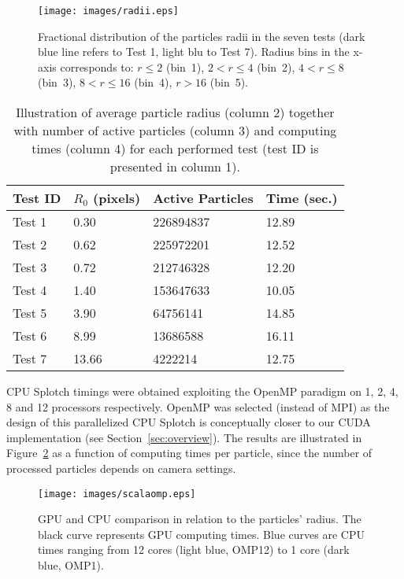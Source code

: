 \documentclass[1p]{elsarticle}
\begin{document}
\begin{figure}
\centering
\texttt{[image: images/radii.eps]}
\caption{Fractional distribution of the particles radii in the seven tests (dark blue line refers to Test 1, light blu to Test 7). Radius bins in the x-axis corresponds to: $r\le 2$ (bin~1), $2<r\le 4$ (bin~2), $4<r\le 8$ (bin~3), $8<r\le 16$ (bin~4), $r>16$ (bin~5). 
}
\label{fig:radii}
\end{figure}

\begin{table}
\begin{center}
\begin{tabular}{|l|l|l|l|}
\hline
Test ID & $R_0$ (pixels) & Active Particles & Time (sec.) \\
\hline
Test 1  & 0.30   & 226894837  & 12.89 \\
\hline
Test 2  & 0.62   & 225972201  & 12.52 \\
\hline
Test 3  & 0.72   & 212746328  & 12.20 \\
\hline
Test 4  & 1.40   & 153647633  & 10.05 \\
\hline
Test 5  & 3.90   & 64756141   & 14.85 \\
\hline
Test 6  & 8.99   & 13686588   & 16.11 \\
\hline
Test 7  & 13.66  & 4222214    & 12.75 \\
\hline
\end{tabular}
\end{center}
\caption{Illustration of average particle radius (column 2) together with number of active particles (column 3)
and computing times (column 4) for each performed test (test ID is presented in column 1).}
\label{tab:radius}
\end{table}

CPU Splotch timings were obtained exploiting the OpenMP paradigm on 1, 2, 4, 8 and 12 processors respectively. OpenMP was selected (instead of MPI) as the design of this parallelized CPU Splotch is conceptually closer to our CUDA implementation (see Section~\ref{sec:overview}). The results are illustrated in Figure~\ref{fig:gpucpu} as a function of computing times per particle, since the number of processed particles depends on camera settings.

\begin{figure}
\centering
\texttt{[image: images/scalaomp.eps]}
\caption{GPU and CPU comparison in relation to the particles' radius. The black curve represents GPU computing times. Blue curves are CPU times ranging from 12 cores (light blue, OMP12) to 1 core (dark blue, OMP1).}
\label{fig:gpucpu}
\end{figure}
\end{document}
